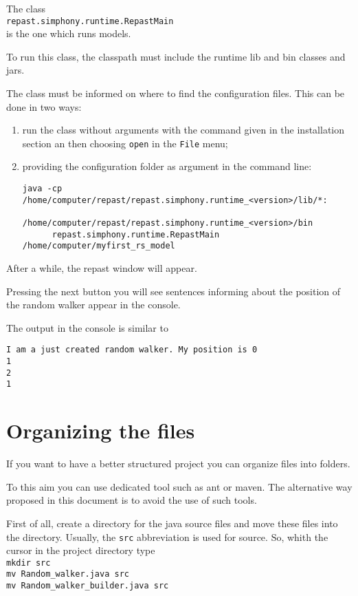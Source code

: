 \documentclass{article}
\begin{document}
The class\\
\verb+repast.simphony.runtime.RepastMain+\\
is the one which runs models. 




To run this class, the classpath must include the runtime lib and bin classes and jars.

The class must be informed on where to find the configuration files. This can be done in two ways:
\begin{enumerate}
\item run the class without arguments with the command given in the installation section an then choosing \verb+open+ in the \verb+File+ menu;
\item
providing the configuration folder as argument in the command line:
\begin{verbatim}
java -cp /home/computer/repast/repast.simphony.runtime_<version>/lib/*:
          /home/computer/repast/repast.simphony.runtime_<version>/bin 
	  repast.simphony.runtime.RepastMain /home/computer/myfirst_rs_model
\end{verbatim}
\end{enumerate}
After a while, the repast window will appear.

Pressing the next button you will see sentences informing about the position of the random walker appear in the console.

The output in the console is similar to

\begin{verbatim}
I am a just created random walker. My position is 0
1
2
1
\end{verbatim}


\section{Organizing the files}
If you want to have a better structured project you can organize files into folders.

To this aim you can use dedicated tool such as ant or maven. The alternative way proposed in this document is to avoid the use of such tools.

First of all, create a directory for the java source files and move these files into the directory. Usually, the \verb+src+ abbreviation is used for source. So, whith the cursor in the project directory type\\
\verb+mkdir src+\\
\verb+mv Random_walker.java src+\\
\verb+mv Random_walker_builder.java src+
\end{document}
